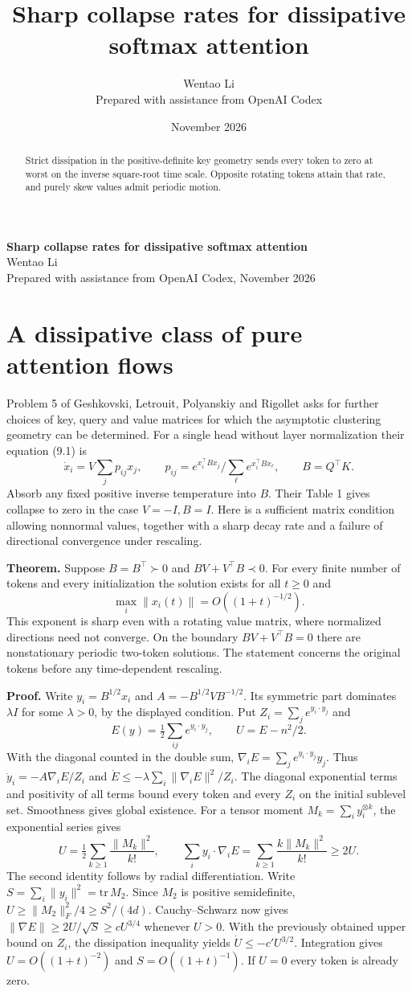 \documentclass[10pt]{article}
\title{Sharp collapse rates for dissipative softmax attention}
\author{Wentao Li\\{\small Prepared with assistance from OpenAI Codex}}
\date{November 2026}
\begin{document}
\begin{center}{\Large\bfseries Sharp collapse rates for dissipative softmax attention}\\[3pt]Wentao Li\\{\small Prepared with assistance from OpenAI Codex, November 2026}\end{center}
\begin{abstract}
Strict dissipation in the positive-definite key geometry sends every token to zero at worst on the inverse square-root time scale. Opposite rotating tokens attain that rate, and purely skew values admit periodic motion.
\end{abstract}
\section*{A dissipative class of pure attention flows}
Problem 5 of Geshkovski, Letrouit, Polyanskiy and Rigollet asks for further choices of key, query and value matrices for which the asymptotic clustering geometry can be determined. For a single head without layer normalization their equation (9.1) is
\[
 \dot x_i=V\sum_j p_{ij}x_j,\qquad p_{ij}=
 e^{x_i^\top Bx_j}/\sum_\ell e^{x_i^\top Bx_\ell},\qquad B=Q^\top K .
\]
Absorb any fixed positive inverse temperature into $B$. Their Table 1 gives collapse to zero in the case $V=-I,B=I$. Here is a sufficient matrix condition allowing nonnormal values, together with a sharp decay rate and a failure of directional convergence under rescaling.

\textbf{Theorem.} Suppose $B=B^\top\succ0$ and $BV+V^\top B\prec0$. For every finite number of tokens and every initialization the solution exists for all $t\ge0$ and
\[
 \max_i\|x_i(t)\|=O((1+t)^{-1/2}).
\]
This exponent is sharp even with a rotating value matrix, where normalized directions need not converge. On the boundary $BV+V^\top B=0$ there are nonstationary periodic two-token solutions. The statement concerns the original tokens before any time-dependent rescaling.

\textbf{Proof.} Write $y_i=B^{1/2}x_i$ and $A=-B^{1/2}VB^{-1/2}$. Its symmetric part dominates $\lambda I$ for some $\lambda>0$, by the displayed condition. Put $Z_i=\sum_j e^{y_i\cdot y_j}$ and
\[
 E(y)=\tfrac12\sum_{ij}e^{y_i\cdot y_j},\qquad U=E-n^2/2.
\]
With the diagonal counted in the double sum, $\nabla_i E=\sum_j e^{y_i\cdot y_j}y_j$. Thus $\dot y_i=-A\nabla_iE/Z_i$ and $\dot E\le-\lambda\sum_i\|\nabla_i E\|^2/Z_i$. The diagonal exponential terms and positivity of all terms bound every token and every $Z_i$ on the initial sublevel set. Smoothness gives global existence. For a tensor moment $M_k=\sum_i y_i^{\otimes k}$, the exponential series gives
\[
 U=\tfrac12\sum_{k\ge1}\frac{\|M_k\|^2}{k!},\qquad
 \sum_i y_i\cdot\nabla_i E=\sum_{k\ge1}\frac{k\|M_k\|^2}{k!}\ge 2U .
\]
The second identity follows by radial differentiation. Write $S=\sum_i\|y_i\|^2=\mathrm{tr}\,M_2$. Since $M_2$ is positive semidefinite, $U\ge \|M_2\|_F^2/4\ge S^2/(4d)$. Cauchy--Schwarz now gives $\|\nabla E\|\ge2U/\sqrt S\ge cU^{3/4}$ whenever $U>0$. With the previously obtained upper bound on $Z_i$, the dissipation inequality yields $\dot U\le-c' U^{3/2}$. Integration gives $U=O((1+t)^{-2})$ and $S=O((1+t)^{-1})$. If $U=0$ every token is already zero.
\end{document}
